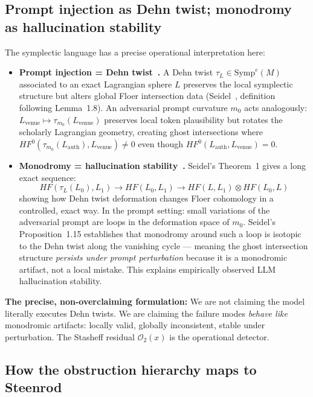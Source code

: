 \documentclass[11pt,a4paper]{article}
\begin{document}
\subsection*{Prompt injection as Dehn twist; monodromy as hallucination stability}

The symplectic language has a precise operational interpretation here:

\begin{itemize}
  \item \textbf{Prompt injection = Dehn twist~\cite{Seidel2002}.}
    A Dehn twist $\tau_L \in \mathrm{Symp}^e(M)$ associated to an exact
    Lagrangian sphere $L$ preserves the local symplectic structure
    but alters global Floer intersection data
    (Seidel~\cite{Seidel2002}, definition following Lemma~1.8).
    An adversarial prompt curvature $m_0$ acts analogously:
    $L_\mathrm{venue} \mapsto \tau_{m_0}(L_\mathrm{venue})$
    preserves local token plausibility but rotates the scholarly
    Lagrangian geometry, creating ghost intersections where
    $HF^0(\tau_{m_0}(L_\mathrm{auth}), L_\mathrm{venue}) \neq 0$
    even though $HF^0(L_\mathrm{auth}, L_\mathrm{venue}) = 0$.

  \item \textbf{Monodromy = hallucination stability~\cite{Seidel2002}.}
    Seidel's Theorem~1 gives a long exact sequence:
    \[
      HF(\tau_L(L_0), L_1) \to HF(L_0, L_1)
      \to HF(L, L_1) \otimes HF(L_0, L)
    \]
    showing how Dehn twist deformation changes Floer cohomology
    in a controlled, exact way.
    In the prompt setting: small variations of the adversarial prompt
    are loops in the deformation space of $m_0$.
    Seidel's Proposition~1.15 establishes that monodromy around such
    a loop is isotopic to the Dehn twist along the vanishing cycle ---
    meaning the ghost intersection structure
    \emph{persists under prompt perturbation}
    because it is a monodromic artifact, not a local mistake.
    This explains empirically observed LLM hallucination stability.
\end{itemize}

\noindent
\textbf{The precise, non-overclaiming formulation:}
We are not claiming the model literally executes Dehn twists.
We are claiming the failure modes \emph{behave like} monodromic
artifacts: locally valid, globally inconsistent, stable under
perturbation. The Stasheff residual $\mathcal{O}_2(x)$ is the
operational detector.

\subsection*{How the obstruction hierarchy maps to Steenrod}
\end{document}
